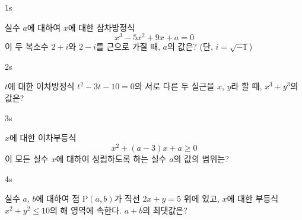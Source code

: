\documentclass[10pt]{article}
\begin{document}


\begin{pagepair}

\begin{problem}{1}{s}
\par\smallskip
실수 $a$에 대하여 $x$에 대한 삼차방정식
$$x^3 - 5x^2 + 9x + a = 0$$
이 두 복소수 $2 + i$와 $2 - i$를 근으로 가질 때, $a$의 값은? (단, $i = \sqrt{-1}$)
\begin{choices}
\end{choices}
\end{problem}

\begin{problem}{2}{s}
\par\smallskip
$t$에 대한 이차방정식 $t^2 - 3t - 10 = 0$의 서로 다른 두 실근을 $x$, $y$라 할 때, $x^3 + y^3$의 값은?
\begin{choices}
\end{choices}
\end{problem}

\end{pagepair}

\begin{pagepair}

\begin{problem}{3}{s}
\par\smallskip
$x$에 대한 이차부등식
$$x^2 + (a - 3)x + a \ge 0$$
이 모든 실수 $x$에 대하여 성립하도록 하는 실수 $a$의 값의 범위는?
\begin{choices}
\end{choices}
\end{problem}

\begin{problem}{4}{s}
\par\smallskip
실수 $a$, $b$에 대하여 점 $\mathrm{P}(a, b)$가 직선 $2x + y = 5$ 위에 있고, $x$에 대한 부등식 $x^2 + y^2 \le 10$의 해 영역에 속한다. $a + b$의 최댓값은?
\begin{choices}
\end{choices}
\end{problem}

\end{pagepair}
\end{document}
